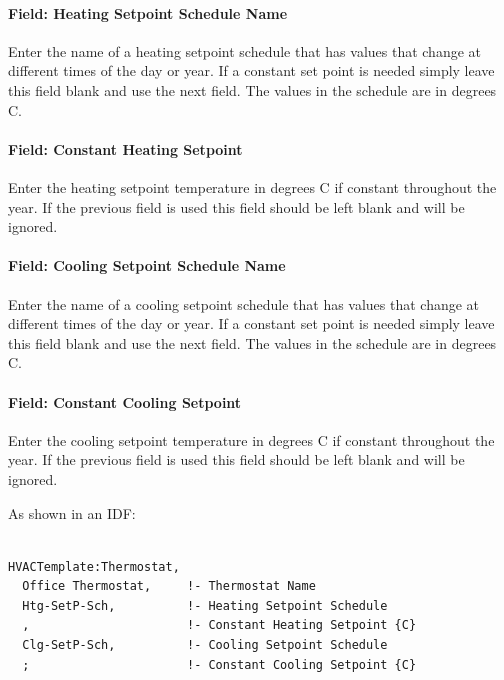 \paragraph{Field: Heating Setpoint Schedule Name}\label{field-heating-setpoint-schedule-name}

Enter the name of a heating setpoint schedule that has values that change at different times of the day or year. If a constant set point is needed simply leave this field blank and use the next field. The values in the schedule are in degrees C.

\paragraph{Field: Constant Heating Setpoint}\label{field-constant-heating-setpoint}

Enter the heating setpoint temperature in degrees C if constant throughout the year. If the previous field is used this field should be left blank and will be ignored.

\paragraph{Field: Cooling Setpoint Schedule Name}\label{field-cooling-setpoint-schedule-name}

Enter the name of a cooling setpoint schedule that has values that change at different times of the day or year. If a constant set point is needed simply leave this field blank and use the next field. The values in the schedule are in degrees C.

\paragraph{Field: Constant Cooling Setpoint}\label{field-constant-cooling-setpoint}

Enter the cooling setpoint temperature in degrees C if constant throughout the year. If the previous field is used this field should be left blank and will be ignored.

As shown in an IDF:

\begin{lstlisting}

HVACTemplate:Thermostat,
  Office Thermostat,     !- Thermostat Name
  Htg-SetP-Sch,          !- Heating Setpoint Schedule
  ,                      !- Constant Heating Setpoint {C}
  Clg-SetP-Sch,          !- Cooling Setpoint Schedule
  ;                      !- Constant Cooling Setpoint {C}
\end{lstlisting}

